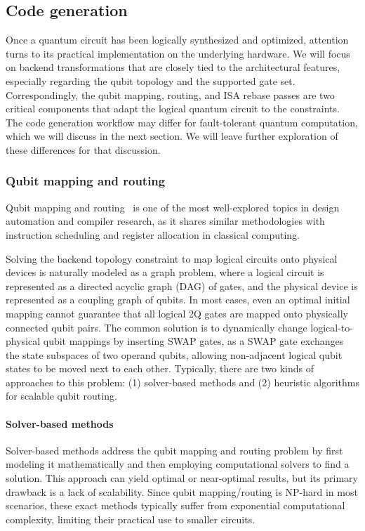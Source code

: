 \documentclass[a4paper,onecolumn,11pt,unpublished]{quantumarticle}
\begin{document}
\subsection{Code generation}

Once a quantum circuit has been logically synthesized and optimized, attention turns to its practical implementation on the underlying hardware. We will focus on backend transformations that are closely tied to the architectural features, especially regarding the qubit topology and the supported gate set. Correspondingly, the qubit mapping, routing, and ISA rebase passes are two critical components that adapt the logical quantum circuit to the constraints. The code generation workflow may differ for fault-tolerant quantum computation, which we will discuss in the next section. We will leave further exploration of these differences for that discussion.


\subsubsection{Qubit mapping and routing} 


Qubit mapping and routing~\cite{zhu_quantum_2025} is one of the most well-explored topics in design automation and compiler research, as it shares similar methodologies with instruction scheduling and register allocation in classical computing.

Solving the backend topology constraint to map logical circuits onto physical devices is naturally modeled as a graph problem, where a logical circuit is represented as a directed acyclic graph (DAG) of gates, and the physical device is represented as a coupling graph of qubits. In most cases, even an optimal initial mapping cannot guarantee that all logical 2Q gates are mapped onto physically connected qubit pairs. The common solution is to dynamically change logical-to-physical qubit mappings by inserting SWAP gates, as a SWAP gate exchanges the state subspaces of two operand qubits, allowing non-adjacent logical qubit states to be moved next to each other. Typically, there are two kinds of approaches to this problem: (1) solver-based methods and (2) heuristic algorithms for scalable qubit routing.



\paragraph{Solver-based methods}


Solver-based methods address the qubit mapping and routing problem by first modeling it mathematically and then employing computational solvers to find a solution. This approach can yield optimal or near-optimal results, but its primary drawback is a lack of scalability. Since qubit mapping/routing is NP-hard in most scenarios, these exact methods typically suffer from exponential computational complexity, limiting their practical use to smaller circuits.
\end{document}
